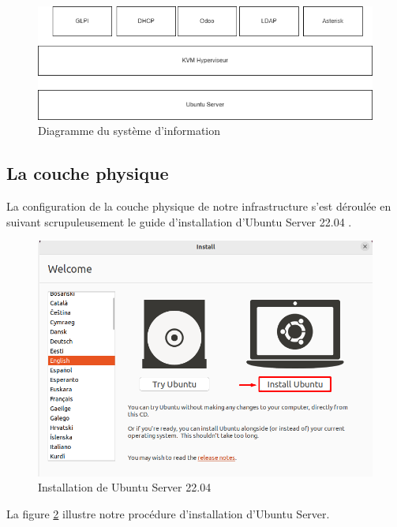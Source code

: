\begin{figure}[H]
\centering
\includegraphics[width=16cm]{Images/diagsi.png}
\caption{Diagramme du système d'information}
\label{fig:diagramme-SI}
\end{figure}






\subsection{La couche physique}

La configuration de la couche physique de notre infrastructure s'est déroulée en suivant scrupuleusement le guide d'installation d'Ubuntu Server 22.04 \cite{linuxgenie_ubuntu2204}. 

\begin{figure}[H]
  \centering
  \includegraphics[width=15cm]{Images/ubuntu-install.png}
  \caption{Installation de Ubuntu Server 22.04}
  \label{fig:ubuntu-install}
\end{figure}

La figure \ref{fig:ubuntu-install} illustre notre procédure d'installation d'Ubuntu Server.

